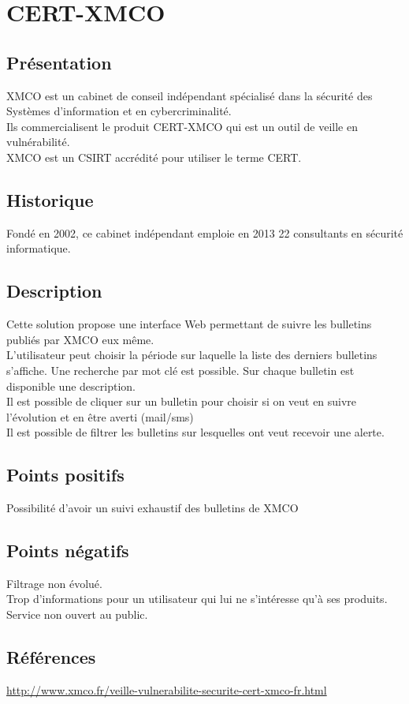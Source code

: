 \section{CERT-XMCO}
\thispagestyle{plain}
\subsection{Présentation}
XMCO est un cabinet de conseil indépendant spécialisé dans la sécurité des Systèmes d’information et en cybercriminalité.\\
Ils commercialisent le produit CERT-XMCO qui est un outil de veille en vulnérabilité.\\
XMCO est un CSIRT accrédité pour utiliser le terme CERT.\\

\subsection{Historique}
Fondé en 2002, ce cabinet indépendant emploie en 2013 22 consultants en sécurité informatique.

\subsection{Description}
Cette solution propose une interface Web permettant de suivre les bulletins publiés par XMCO eux même.\\
L’utilisateur peut choisir la période sur laquelle la liste des derniers bulletins s’affiche. Une recherche par mot clé est possible. Sur chaque bulletin est disponible une description.\\
Il est possible de cliquer sur un bulletin pour choisir si on veut en suivre l’évolution et en être averti (mail/sms)\\
Il est possible de filtrer les bulletins sur lesquelles ont veut recevoir une alerte.\\

\subsection{Points positifs}
Possibilité d’avoir un suivi exhaustif des bulletins de XMCO

\subsection{Points négatifs}
Filtrage non évolué.\\
Trop d’informations pour un utilisateur qui lui ne s’intéresse qu’à ses produits.\\
Service non ouvert au public.\\

\subsection{Références}
\small
\noindent
\url{http://www.xmco.fr/veille-vulnerabilite-securite-cert-xmco-fr.html}
\normalsize